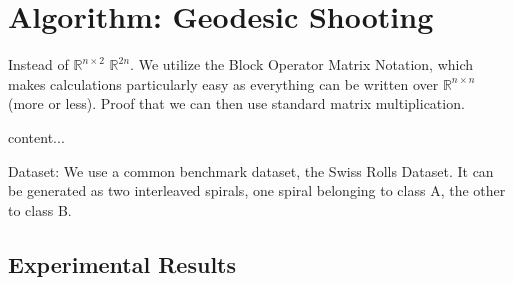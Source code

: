 \section{Algorithm: Geodesic Shooting}

Instead of $\mathbb{R}^{n\times2}$ $\mathbb{R}^{2n}$.
We utilize the Block Operator Matrix Notation, which makes calculations particularly easy as everything can be written over $\mathbb{R}^{n\times n}$ (more or less).
Proof that we can then use standard matrix multiplication.



\begin{definition}
	content...
\end{definition}

Dataset: We use a common benchmark dataset, the Swiss Rolls Dataset.
It can be generated as two interleaved spirals, one spiral belonging to class A, the other to class B.

\subsection{Experimental Results}
